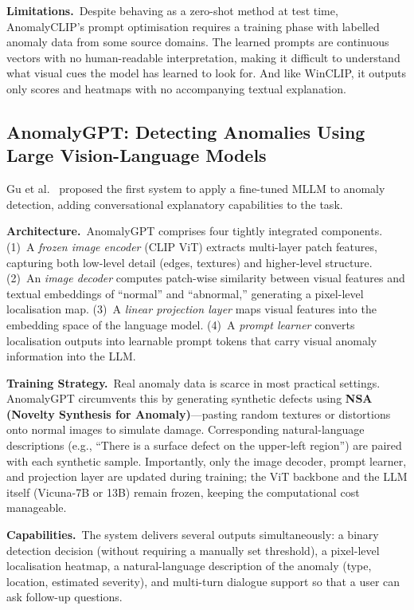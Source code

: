 \documentclass[conference]{IEEEtran}
\begin{document}
\textbf{Limitations.}\ Despite behaving as a zero-shot method at test time, AnomalyCLIP's prompt optimisation requires a training phase with labelled anomaly data from some source domains. The learned prompts are continuous vectors with no human-readable interpretation, making it difficult to understand what visual cues the model has learned to look for. And like WinCLIP, it outputs only scores and heatmaps with no accompanying textual explanation.

\subsection{AnomalyGPT: Detecting Anomalies Using Large Vision-Language Models}

Gu et al.~\cite{gu2024anomalygpt} proposed the first system to apply a fine-tuned MLLM to anomaly detection, adding conversational explanatory capabilities to the task.

\textbf{Architecture.}\ AnomalyGPT comprises four tightly integrated components. (1)~A \textit{frozen image encoder} (CLIP ViT) extracts multi-layer patch features, capturing both low-level detail (edges, textures) and higher-level structure. (2)~An \textit{image decoder} computes patch-wise similarity between visual features and textual embeddings of ``normal'' and ``abnormal,'' generating a pixel-level localisation map. (3)~A \textit{linear projection layer} maps visual features into the embedding space of the language model. (4)~A \textit{prompt learner} converts localisation outputs into learnable prompt tokens that carry visual anomaly information into the LLM.

\textbf{Training Strategy.}\ Real anomaly data is scarce in most practical settings. AnomalyGPT circumvents this by generating synthetic defects using \textbf{NSA (Novelty Synthesis for Anomaly)}---pasting random textures or distortions onto normal images to simulate damage. Corresponding natural-language descriptions (e.g., ``There is a surface defect on the upper-left region'') are paired with each synthetic sample. Importantly, only the image decoder, prompt learner, and projection layer are updated during training; the ViT backbone and the LLM itself (Vicuna-7B or 13B) remain frozen, keeping the computational cost manageable.

\textbf{Capabilities.}\ The system delivers several outputs simultaneously: a binary detection decision (without requiring a manually set threshold), a pixel-level localisation heatmap, a natural-language description of the anomaly (type, location, estimated severity), and multi-turn dialogue support so that a user can ask follow-up questions.
\end{document}
